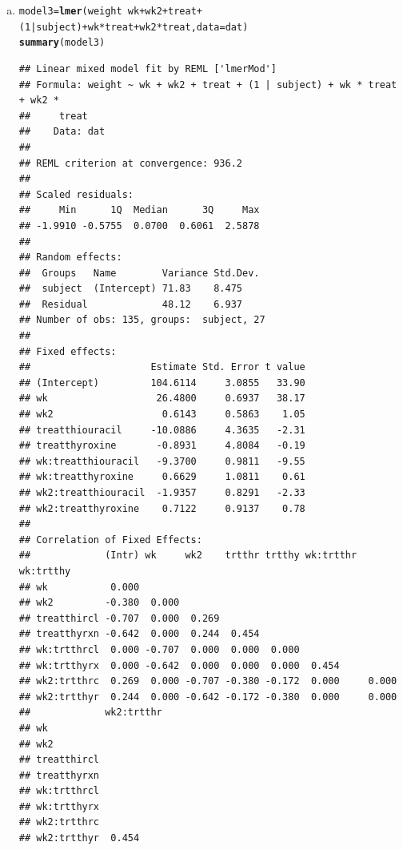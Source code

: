 \documentclass{article}\usepackage[]{graphicx}\usepackage[]{color}
\makeatletter
\newcommand{\hlnum}[1]{\textcolor[rgb]{0.686,0.059,0.569}{#1}}%
\newcommand{\hlopt}[1]{\textcolor[rgb]{0,0,0}{#1}}%
\newcommand{\hlstd}[1]{\textcolor[rgb]{0.345,0.345,0.345}{#1}}%
\newcommand{\hlkwb}[1]{\textcolor[rgb]{0.69,0.353,0.396}{#1}}%
\newcommand{\hlkwc}[1]{\textcolor[rgb]{0.333,0.667,0.333}{#1}}%
\newcommand{\hlkwd}[1]{\textcolor[rgb]{0.737,0.353,0.396}{\textbf{#1}}}%
\newenvironment{kframe}{%
 \def\at@end@of@kframe{}%
 \ifinner\ifhmode%
  \def\at@end@of@kframe{\end{minipage}}%
  \begin{minipage}{\columnwidth}%
 \fi\fi%
 \def\FrameCommand##1{\hskip\@totalleftmargin \hskip-\fboxsep
 \colorbox{shadecolor}{##1}\hskip-\fboxsep
     \hskip-\linewidth \hskip-\@totalleftmargin \hskip\columnwidth}%
 \MakeFramed {\advance\hsize-\width
   \@totalleftmargin\z@ \linewidth\hsize
   \@setminipage}}%
 {\par\unskip\endMakeFramed%
 \at@end@of@kframe}
\newenvironment{knitrout}{}{} %
\makeatother
\begin{document}
\begin{enumerate}[(a)]
\item

\begin{knitrout}
\color{fgcolor}\begin{kframe}
\begin{alltt}
  \hlstd{model3} \hlkwb{=} \hlkwd{lmer}\hlstd{(weight} \hlopt{~} \hlstd{wk} \hlopt{+} \hlstd{wk2} \hlopt{+} \hlstd{treat}  \hlopt{+} \hlstd{(}\hlnum{1}\hlopt{|}\hlstd{subject)} \hlopt{+} \hlstd{wk}\hlopt{*}\hlstd{treat} \hlopt{+} \hlstd{wk2}\hlopt{*}\hlstd{treat,} \hlkwc{data} \hlstd{= dat )}
  \hlkwd{summary}\hlstd{(model3)}
\end{alltt}
\begin{verbatim}
## Linear mixed model fit by REML ['lmerMod']
## Formula: weight ~ wk + wk2 + treat + (1 | subject) + wk * treat + wk2 *  
##     treat
##    Data: dat
## 
## REML criterion at convergence: 936.2
## 
## Scaled residuals: 
##     Min      1Q  Median      3Q     Max 
## -1.9910 -0.5755  0.0700  0.6061  2.5878 
## 
## Random effects:
##  Groups   Name        Variance Std.Dev.
##  subject  (Intercept) 71.83    8.475   
##  Residual             48.12    6.937   
## Number of obs: 135, groups:  subject, 27
## 
## Fixed effects:
##                     Estimate Std. Error t value
## (Intercept)         104.6114     3.0855   33.90
## wk                   26.4800     0.6937   38.17
## wk2                   0.6143     0.5863    1.05
## treatthiouracil     -10.0886     4.3635   -2.31
## treatthyroxine       -0.8931     4.8084   -0.19
## wk:treatthiouracil   -9.3700     0.9811   -9.55
## wk:treatthyroxine     0.6629     1.0811    0.61
## wk2:treatthiouracil  -1.9357     0.8291   -2.33
## wk2:treatthyroxine    0.7122     0.9137    0.78
## 
## Correlation of Fixed Effects:
##             (Intr) wk     wk2    trtthr trtthy wk:trtthr wk:trtthy
## wk           0.000                                                
## wk2         -0.380  0.000                                         
## treatthircl -0.707  0.000  0.269                                  
## treatthyrxn -0.642  0.000  0.244  0.454                           
## wk:trtthrcl  0.000 -0.707  0.000  0.000  0.000                    
## wk:trtthyrx  0.000 -0.642  0.000  0.000  0.000  0.454             
## wk2:trtthrc  0.269  0.000 -0.707 -0.380 -0.172  0.000     0.000   
## wk2:trtthyr  0.244  0.000 -0.642 -0.172 -0.380  0.000     0.000   
##             wk2:trtthr
## wk                    
## wk2                   
## treatthircl           
## treatthyrxn           
## wk:trtthrcl           
## wk:trtthyrx           
## wk2:trtthrc           
## wk2:trtthyr  0.454
\end{verbatim}
\end{kframe}
\end{knitrout}


\end{enumerate}
\end{document}
